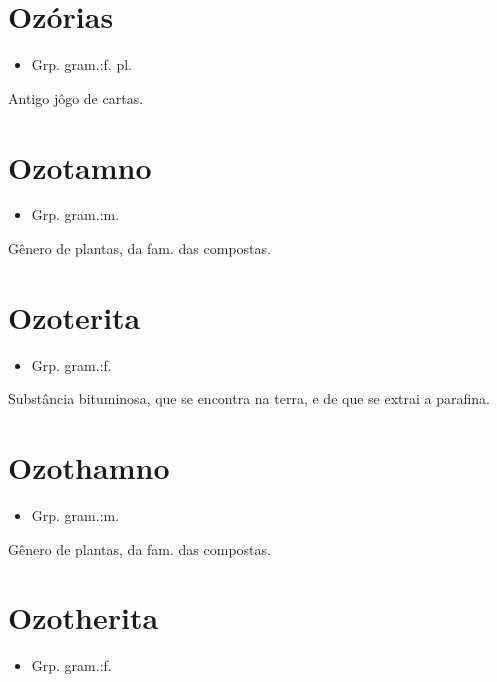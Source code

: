 \section{Ozórias}
\begin{itemize}
\item {Grp. gram.:f. pl.}
\end{itemize}
Antigo jôgo de cartas.
\section{Ozotamno}
\begin{itemize}
\item {Grp. gram.:m.}
\end{itemize}
Gênero de plantas, da fam. das compostas.
\section{Ozoterita}
\begin{itemize}
\item {Grp. gram.:f.}
\end{itemize}
Substância bituminosa, que se encontra na terra, e de que se extrai a parafina.
\section{Ozothamno}
\begin{itemize}
\item {Grp. gram.:m.}
\end{itemize}
Gênero de plantas, da fam. das compostas.
\section{Ozotherita}
\begin{itemize}
\item {Grp. gram.:f.}
\end{itemize}
